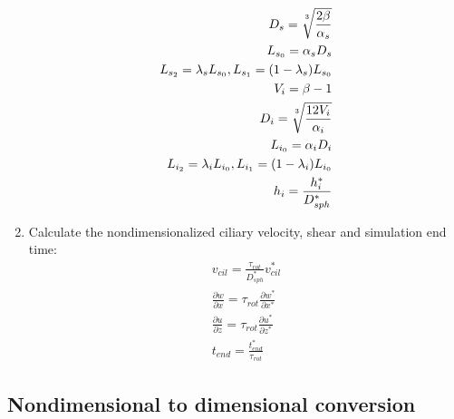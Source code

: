 \documentclass[10pt,a4paper]{article}
\def\non{\nonumber}
\def\p{\partial}
\begin{document}
\begin{enumerate}
	\begin{eqnarray}\label{d2ndpars4a}
		D_s = \sqrt[\uproot{5}3]{\frac{2 \beta}{\alpha_s}} \non \\
		L_{s_0} = \alpha_s D_s \non \\
		L_{s_2} = \lambda_s L_{s_0}, L_{s_1} = (1 - \lambda_s) L_{s_0} \non \\
		V_i = \beta - 1 \non \\
		D_i = \sqrt[\uproot{5}3]{\frac{12 V_i}{\alpha_i}} \non \\
		L_{i_0} = \alpha_i D_i \non \\
		L_{i_2} = \lambda_i L_{i_0}, L_{i_1} = (1 - \lambda_i) L_{i_0} \non \\
		h_i = \frac{h^*_i}{D_{sph}^*}
\end{eqnarray}
	\item Calculate the nondimensionalized ciliary velocity, shear and simulation end time:
	\begin{eqnarray}\label{d2ndpars5}
		v_{cil} = \frac{{\tau_{rot}}}{D_{sph}^*}  v^*_{cil} \non \\
		\frac{\p w}{\p x} = \tau_{rot} \frac{\p w^*}{\p x^*} \non \\
		\frac{\p u}{\p z} = \tau_{rot} \frac{\p u^*}{\p z^*} \non \\
		t_{end} = \frac{t^*_{end}}{\tau_{rot}}
	\end{eqnarray}
\end{enumerate}
 
\subsection{Nondimensional to dimensional conversion}
\end{document}
